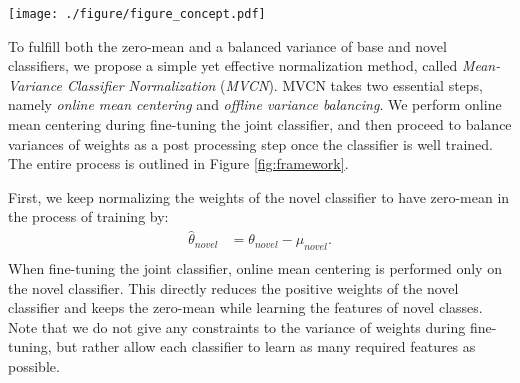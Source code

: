 \begin{figure*}[t!]
   \centering 
    \texttt{[image: ./figure/figure\_concept.pdf]}
   \caption{Overview of Mean-Variance Classifier Normalization. In the pre-training stage, we train the entire model on all base classes. In the fine-tuning stage, we normalize the novel classifier by online mean centering in the process of training and adjust the trained weights of the base and novel classifiers by re-scaling them using the standard deviation ratio.}
   \label{fig:framework}
\end{figure*}

To fulfill both the zero-mean and a balanced variance of base and novel classifiers, we propose a simple yet effective normalization method, called \textit{Mean-Variance Classifier Normalization} (\textit{MVCN}). MVCN takes two essential steps, namely \textit{online mean centering} and \textit{offline variance balancing}. We perform online mean centering during fine-tuning the joint classifier, and then proceed to balance variances of weights as a post processing step once the classifier is well trained. The entire process is outlined in Figure \ref{fig:framework}.


 First, we keep normalizing the weights of the novel classifier to have zero-mean in the process of training by:
\begin{equation}
\begin{aligned}
  \hat \theta_{novel} &= \theta_{novel} - \mu_{novel}. \\
\end{aligned}
\end{equation}
When fine-tuning the joint classifier, online mean centering is performed only on the novel classifier. This directly reduces the positive weights of the novel classifier and keeps the zero-mean while learning the features of novel classes. Note that we do not give any constraints to the variance of weights during fine-tuning, but rather allow each classifier to learn as many required features as possible.








